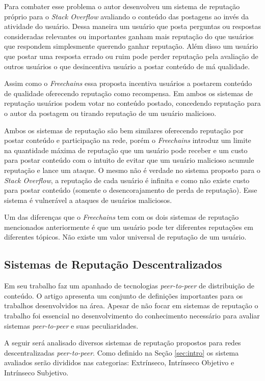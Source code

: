 \documentclass[12pt]{article}
\newcommand{\FC} {\emph{Freechains}\xspace}
\newcommand{\PtoP} {\emph{peer-to-peer}\xspace}
\begin{document}
Para combater esse problema o autor desenvolveu um sistema de reputação próprio para o \emph{Stack Overflow} avaliando o conteúdo das postagens ao invés da atividade do usuário. Dessa maneira um usuário que posta perguntas ou respostas consideradas relevantes ou importantes ganham mais reputação do que usuários que respondem simplesmente querendo ganhar reputação. Além disso um usuário que postar uma resposta errado ou ruim pode perder reputação pela avaliação de outros usuários o que desincentiva usuário a postar conteúdo de má qualidade. 

Assim como o \FC essa proposta incentiva usuários a postarem conteúdo de qualidade oferecendo reputação como recompensa. Em ambos os sistemas de reputação usuários podem votar no conteúdo postado, concedendo reputação para o autor da postagem ou tirando reputação de um usuário malicioso. 

Ambos os sistemas de reputação são bem similares oferecendo reputação por postar conteúdo e participação na rede, porém o \FC introduz um limite na quantidade máxima de reputação que um usuário pode receber e um custo para postar conteúdo com o intuito de evitar que um usuário malicioso acumule reputação e lance um ataque. O mesmo não é verdade no sistema proposto para o \emph{Stack Overflow}, a reputação de cada usuário é infinita e como não existe custo para postar conteúdo (somente o desencorajamento de perda de reputação). Esse sistema é vulnerável a ataques de usuários maliciosos.

Um das diferenças que o \FC tem com os dois sistemas de reputação mencionados anteriormente é que um usuário pode ter diferentes reputações em diferentes tópicos. Não existe um valor universal de reputação de um usuário.  

\subsection{Sistemas de Reputação Descentralizados} \label{subsec:SRDescen}

Em seu trabalho \cite{10.1145/1041680.1041681} faz um apanhado de tecnologias \PtoP de distribuição de conteúdo. O artigo apresenta um conjunto de definições importantes para os trabalhos desenvolvidos na área. Apesar de não focar em sistemas de reputação o trabalho foi essencial no desenvolvimento do conhecimento necessário para avaliar sistemas \PtoP e suas peculiaridades.

A seguir será analisado diversos sistemas de reputação propostos para redes descentralizadas \PtoP. Como definido na Seção \ref{sec:intro} os sistema avaliados serão divididos nas categorias: Extrínseco, Intrínseco Objetivo e Intrínseco Subjetivo.
\end{document}
